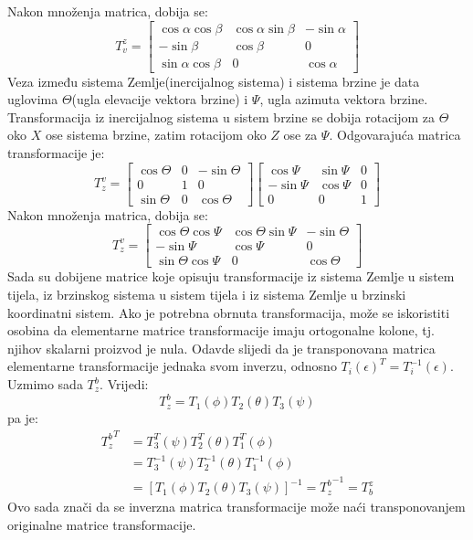 Nakon množenja matrica, dobija se:
\begin{equation}
    T_{v}^z = \begin{bmatrix}
        \cos\alpha\cos\beta & \cos\alpha\sin\beta & -\sin\alpha \\
        -\sin\beta & \cos\beta & 0\\
        \sin\alpha\cos\beta & 0 & \cos\alpha
    \end{bmatrix}
    \label{eq:VtoB}
\end{equation}
Veza između sistema Zemlje(inercijalnog sistema) i sistema brzine je data uglovima $\Theta$(ugla elevacije vektora brzine)
i $\Psi$, ugla azimuta vektora brzine. Transformacija iz inercijalnog sistema u sistem brzine se dobija rotacijom 
za $\Theta$ oko $X$ ose sistema brzine, zatim rotacijom oko $Z$ ose za $\Psi$. Odgovarajuća matrica transformacije je:
\begin{equation}
    T_{z}^v = \begin{bmatrix}
        \cos\Theta & 0 & -\sin\Theta \\
        0& 1& 0\\
        \sin\Theta & 0 & \cos\Theta
    \end{bmatrix}
    \begin{bmatrix}
        \cos\Psi & \sin\Psi & 0\\
        -\sin\Psi & \cos\Psi & 0\\
        0 & 0& 1
        \end{bmatrix}
        \label{eq:ztov}
\end{equation}
Nakon množenja matrica, dobija se:
\begin{equation}
    T_{z}^v = \begin{bmatrix}
        \cos\Theta\cos\Psi & \cos\Theta\sin\Psi & -\sin\Theta \\
        -\sin\Psi & \cos\Psi & 0\\
        \sin\Theta\cos\Psi & 0 & \cos\Theta
    \end{bmatrix}
\end{equation}
Sada su dobijene matrice koje opisuju transformacije iz sistema Zemlje u sistem tijela, 
iz brzinskog sistema u sistem tijela i iz sistema Zemlje u brzinski koordinatni sistem. 
Ako je potrebna obrnuta transformacija, može se iskoristiti osobina da elementarne matrice transformacije 
imaju ortogonalne kolone, tj. njihov skalarni proizvod je nula. Odavde slijedi 
da je transponovana matrica elementarne transformacije jednaka svom inverzu, odnosno $T_i(\epsilon)^T = T_i^{-1}(\epsilon)$.
Uzmimo sada $T_{z}^b$. Vrijedi:
\begin{equation*}
    T_{z}^b = T_1(\phi)T_2(\theta)T_3(\psi)
\end{equation*}
pa je:
\begin{align*}    
    { T_{z}^b}^T &= T_3^T(\psi)T_2^T(\theta)T_1^T(\phi)\\ & =  T_3^{-1}(\psi)T_2^{-1}(\theta)T_1^{-1}(\phi)\\
    & = [T_1(\phi)T_2(\theta)T_3(\psi)]^{-1} = {T_{z}^b}^{-1} = T_{b}^z
\end{align*}
Ovo sada znači da se inverzna matrica transformacije može naći transponovanjem originalne matrice 
transformacije. 

